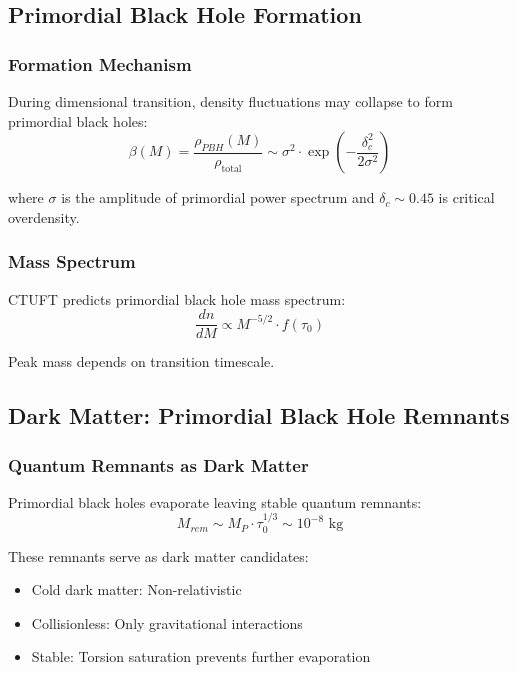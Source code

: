 \subsection{Primordial Black Hole Formation}

\subsubsection{Formation Mechanism}

During dimensional transition, density fluctuations may collapse to form primordial black holes:
\begin{equation}
    \beta(M) = \frac{\rho_{PBH}(M)}{\rho_{\text{total}}} \sim \sigma^2 \cdot \exp\left(-\frac{\delta_c^2}{2\sigma^2}\right)
\end{equation}

where $\sigma$ is the amplitude of primordial power spectrum and $\delta_c \sim 0.45$ is critical overdensity.

\subsubsection{Mass Spectrum}

CTUFT predicts primordial black hole mass spectrum:
\begin{equation}
    \frac{dn}{dM} \propto M^{-5/2} \cdot f(\tau_0)
\end{equation}

Peak mass depends on transition timescale.

\subsection{Dark Matter: Primordial Black Hole Remnants}

\subsubsection{Quantum Remnants as Dark Matter}

Primordial black holes evaporate leaving stable quantum remnants:
\begin{equation}
    M_{rem} \sim M_P \cdot \tau_0^{1/3} \sim 10^{-8} \text{ kg}
\end{equation}

These remnants serve as dark matter candidates:
\begin{itemize}
    \item Cold dark matter: Non-relativistic
    \item Collisionless: Only gravitational interactions
    \item Stable: Torsion saturation prevents further evaporation
\end{itemize}

